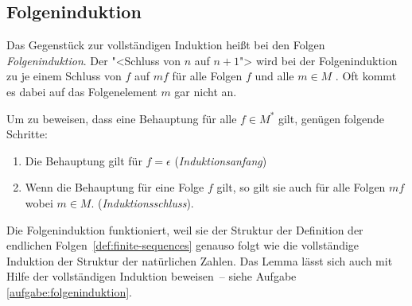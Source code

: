 \subsection{Folgeninduktion}
\label{sec:sequence-induction}
Das Gegenstück zur vollständigen Induktion heißt bei den Folgen
\textit{Folgeninduktion}.  Der "<Schluss von $n$ auf $n+1$"> wird bei
der Folgeninduktion zu je einem Schluss von $f$ auf $mf$ für alle
Folgen $f$ und alle $m\in M$ . Oft kommt es dabei auf das Folgenelement $m$ gar
nicht an.

Um zu beweisen, dass eine Behauptung für alle
$f\in M^\ast$ gilt, genügen folgende Schritte:
\begin{enumerate} 
\item Die Behauptung gilt für $f=\epsilon$ (\textit{Induktionsanfang})
\item Wenn die Behauptung für eine Folge $f$ gilt, so gilt sie auch
  für alle Folgen $mf$ wobei $m\in{M}$.
  (\textit{Induktionsschluss}).
\end{enumerate}
% 
Die Folgeninduktion funktioniert, weil sie der Struktur der Definition
der endlichen Folgen~\ref{def:finite-sequences} genauso folgt wie die
vollständige Induktion der Struktur der natürlichen Zahlen.  Das Lemma
lässt sich auch mit Hilfe der vollständigen Induktion beweisen~-- siehe
Aufgabe \ref{aufgabe:folgeninduktion}.

